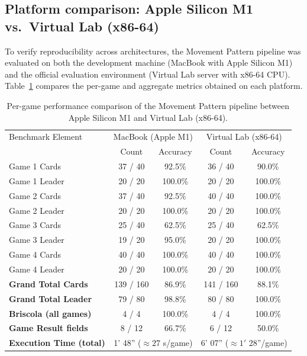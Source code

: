 \documentclass[11pt,a4paper]{article}
\begin{document}
\subsection{Platform comparison: Apple Silicon M1 vs.\ Virtual Lab (x86-64)}

To verify reproducibility across architectures, the Movement Pattern pipeline
was evaluated on both the development machine (MacBook with Apple Silicon M1)
and the official evaluation environment (Virtual Lab server with x86-64 CPU).
Table~\ref{tab:platform-comparison} compares the per-game and aggregate metrics
obtained on each platform.

\begin{table}[h]
    \centering
    {\small
    \setlength{\tabcolsep}{2.5pt}
    \begin{tabular}{lcccc}
        \hline
        Benchmark Element & \multicolumn{2}{c}{MacBook (Apple M1)} & \multicolumn{2}{c}{Virtual Lab (x86-64)} \\
        & Count & Accuracy & Count & Accuracy \\
        \hline
        Game 1 Cards & 37 / 40 & 92.5\% & 36 / 40 & 90.0\% \\
        Game 1 Leader & 20 / 20 & 100.0\% & 20 / 20 & 100.0\% \\
        Game 2 Cards & 37 / 40 & 92.5\% & 40 / 40 & 100.0\% \\
        Game 2 Leader & 20 / 20 & 100.0\% & 20 / 20 & 100.0\% \\
        Game 3 Cards & 25 / 40 & 62.5\% & 25 / 40 & 62.5\% \\
        Game 3 Leader & 19 / 20 & 95.0\% & 20 / 20 & 100.0\% \\
        Game 4 Cards & 40 / 40 & 100.0\% & 40 / 40 & 100.0\% \\
        Game 4 Leader & 20 / 20 & 100.0\% & 20 / 20 & 100.0\% \\
        \hline
        \textbf{Grand Total Cards} & 139 / 160 & 86.9\% & 141 / 160 & 88.1\% \\
        \textbf{Grand Total Leader} & 79 / 80 & 98.8\% & 80 / 80 & 100.0\% \\
        \textbf{Briscola (all games)} & 4 / 4 & 100.0\% & 4 / 4 & 100.0\% \\
        \textbf{Game Result fields} & 8 / 12 & 66.7\% & 6 / 12 & 50.0\% \\
        \textbf{Execution Time (total)} & \multicolumn{2}{c}{1' 48'' ($\approx 27$ s/game)} & \multicolumn{2}{c}{6' 07'' ($\approx 1'$ 28''/game)} \\
        \hline
    \end{tabular}\par}
    \caption{Per-game performance comparison of the Movement Pattern pipeline between Apple Silicon M1 and Virtual Lab (x86-64).}
    \label{tab:platform-comparison}
\end{table}
\end{document}
